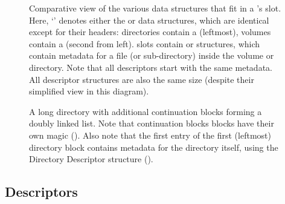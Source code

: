 
\begin{figure}
 \centering
 

 \caption[CFT Directory Entry data structures]{\label{fig:entry-ds} Comparative
   view of the various data structures that fit in a 's
    slot. Here, ‘’ denotes either the
    or  data structures, which are identical except
   for their headers: directories contain a  (leftmost), volumes
   contain a  (second from left).  slots contain
    or  structures, which contain metadata for a file
   (or sub-directory) inside the volume or directory. Note that all descriptors
   start with the same metadata. All descriptor structures are also the same
   size (despite their simplified view in this diagram).}
\end{figure}


\begin{figure}
 \centering
 

 \caption[CFT Directory Linked List]{\label{fig:fs-directory-ll} A long
   directory with additional  continuation blocks forming a
   doubly linked list. Note that continuation blocks blocks have their own
   magic (\magicDirectoryCont). Also note that the first entry of the first
   (leftmost) directory block contains metadata for the directory itself, using
   the Directory Descriptor structure (). }
\end{figure}

\subsection{Descriptors}

